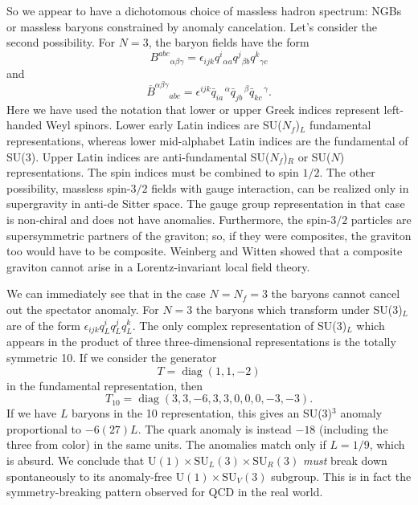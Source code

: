 
So we appear to have a dichotomous choice of massless hadron spectrum: NGBs
or massless baryons constrained by anomaly cancelation. Let's consider the
second possibility. For $N=3$, the baryon fields have the form
\[
  B^{abc}{}_{\alpha\beta\gamma}
  =\epsilon_{ijk}q^i{}_{\alpha a}q^j{}_{\beta b}q^k{}_{\gamma c}
\]
and
\[
  \overline B^{\alpha\beta\gamma}{}_{abc}
  =\epsilon^{ijk}\bar q_{i a}{}^{\,\alpha}\bar q_{j b}{}^{\,\beta}
  \bar q_{k c}{}^{\,\gamma} .
\]
Here we have used the notation that lower or upper Greek indices represent
left-handed Weyl spinors. Lower early Latin indices are SU($N_f$)$_L$
fundamental representations, whereas lower mid-alphabet Latin indices are the
fundamental of SU(3). Upper Latin indices are anti-fundamental
SU($N_f$)$_R$ or SU($N$) representations. The spin indices must be combined
to spin $1/2$. The other possibility, massless spin-$3/2$ fields with gauge
interaction, can be realized only in supergravity in anti-de Sitter space. The
gauge group representation in that case is non-chiral and does not have
anomalies. Furthermore, the spin-$3/2$ particles are supersymmetric partners
of the graviton; so, if they were composites, the graviton too would have to
be composite. Weinberg and Witten \cite{banks-ref-108} showed that a composite graviton
cannot arise in a Lorentz-invariant local field theory.

We can immediately see that in the case $N=N_f=3$ the baryons cannot cancel
out the spectator anomaly. For $N=3$ the baryons which transform under
SU(3)$_L$ are of the form $\epsilon_{ijk}q_L^i q_L^j q_L^k$. The only
complex representation of SU(3)$_L$ which appears in the product of three
three-dimensional representations is the totally symmetric 10. If we
consider the generator
\[
  T=\operatorname{diag}(1,1,-2)
\]
in the fundamental representation, then
\[
  T_{10}=\operatorname{diag}(3,3,-6,3,3,0,0,0,-3,-3) .
\]
If we have $L$ baryons in the 10 representation, this gives an SU(3)$^3$
anomaly proportional to $-6(27)L$. The quark anomaly is instead $-18$
(including the three from color) in the same units. The anomalies match only
if $L=1/9$, which is absurd. We conclude that
$\mathrm{U}(1)\times\mathrm{SU}_L(3)\times\mathrm{SU}_R(3)$ \emph{must}
break down spontaneously to its anomaly-free
$\mathrm{U}(1)\times\mathrm{SU}_V(3)$ subgroup. This is in fact the
symmetry-breaking pattern observed for QCD in the real world.

